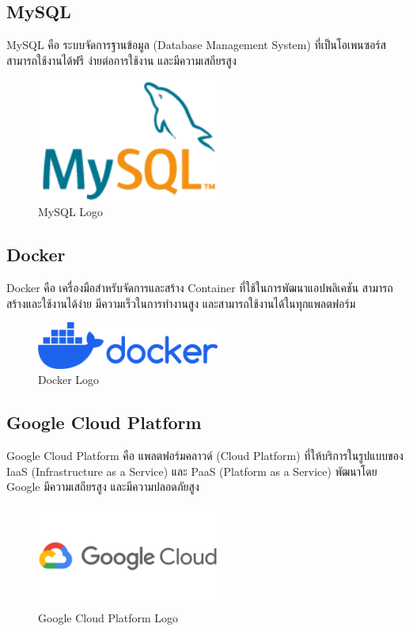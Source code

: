 \newpage

\subsection{MySQL}

MySQL คือ ระบบจัดการฐานข้อมูล (Database Management System) ที่เป็นโอเพนซอร์ส สามารถใช้งานได้ฟรี ง่ายต่อการใช้งาน และมีความเสถียรสูง \cite{WhatIsMySQL}

\begin{figure}[H]
    \centering
    \includegraphics[width=60mm,scale=1.0]{images/mysql.png}
    \caption{MySQL Logo}
    \label{fig:mysql}
\end{figure}

\subsection{Docker}

Docker คือ เครื่องมือสำหรับจัดการและสร้าง Container ที่ใช้ในการพัฒนาแอปพลิเคชัน สามารถสร้างและใช้งานได้ง่าย มีความเร็วในการทำงานสูง และสามารถใช้งานได้ในทุกแพลตฟอร์ม \cite{WhatIsDocker}

\begin{figure}[H]
    \centering
    \includegraphics[width=60mm,scale=1.0]{images/docker.png}
    \caption{Docker Logo}
    \label{fig:docker}
\end{figure}

\subsection{Google Cloud Platform}

Google Cloud Platform คือ แพลตฟอร์มคลาวด์ (Cloud Platform) ที่ให้บริการในรูปแบบของ IaaS (Infrastructure as a Service) และ PaaS (Platform as a Service) พัฒนาโดย Google มีความเสถียรสูง และมีความปลอดภัยสูง \cite{GCPNewbie}

\begin{figure}[H]
    \centering
    \includegraphics[width=60mm,scale=1.0]{images/gcp.png}
    \caption{Google Cloud Platform Logo}
    \label{fig:gcp}
\end{figure}